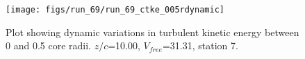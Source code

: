 \begin{figure}[H]
\centering
\texttt{[image: figs/run\_69/run\_69\_ctke\_005rdynamic]}
\caption{Plot showing dynamic variations in turbulent kinetic energy between 0 and 0.5 core radii. $z/c$=10.00, $V_{free}$=31.31, station 7.}
\end{figure}


